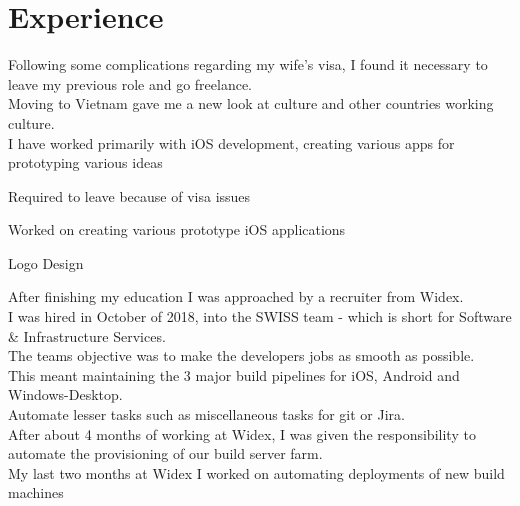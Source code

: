 \documentclass[]{cv}
\begin{document}
\begin{minipage}[t]{0.66\textwidth} 

\section{Experience}

\descript{ }

Following some complications regarding my wife’s visa, I found it necessary to leave my previous role and go freelance. \\
Moving to Vietnam gave me a new look at culture and other countries working culture. \\
I have worked primarily with iOS development, creating various apps for prototyping various ideas \\

\vspace{\topsep} %
\begin{tightemize}
	\item Required to leave because of visa issues
	\item Worked on creating various prototype iOS applications
	\item Logo Design
\end{tightemize}
\sectionsep


After finishing my education I was approached by a recruiter from Widex. \\
I was hired in October of 2018, into the SWISS team - which is short for Software \& Infrastructure Services. \\
The teams objective was to make the developers jobs as smooth as possible. \\
This meant maintaining the 3 major build pipelines for iOS, Android and Windows-Desktop. \\
Automate lesser tasks such as miscellaneous tasks for git or Jira. \\
After about 4 months of working at Widex, I was given the responsibility to automate the provisioning of our build server farm. \\
My last two months at Widex I worked on automating deployments of new build machines


\end{minipage}
\end{document}
